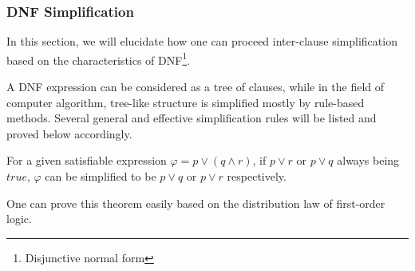\subsubsection{DNF Simplification}
\label{section:DNFSimplification}
In this section, we will elucidate how one can proceed inter-clause simplification based on the characteristics of DNF\footnote{Disjunctive normal form}.

A DNF expression can be considered as a tree of clauses, while in the field of computer algorithm, tree-like structure is simplified mostly by rule-based methods. Several general and effective simplification rules will be listed and proved below accordingly.

\begin{theorem}
For a given satisfiable expression $\varphi = p \vee (q \wedge r)$, if $p \vee r$ or $p \vee q$ always being $true$, $\varphi$ can be simplified to be $p \vee q$ or $p \vee r$ respectively.
\end{theorem}
One can prove this theorem easily based on the distribution law of first-order logic.

